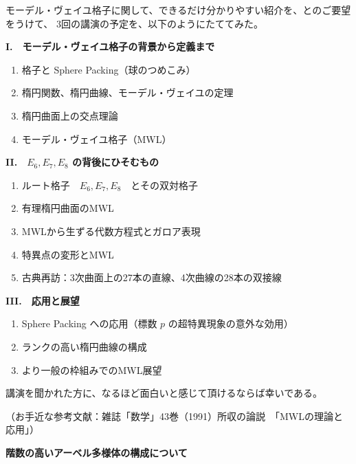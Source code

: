 \documentclass[uplatex,dvipdfmx]{jlreq}
\begin{document}
\bigskip

モーデル・ヴェイユ格子に関して、できるだけ分かりやすい紹介を、とのご要望をうけて、
3回の講演の予定を、以下のようにたててみた。

\bigskip\bigskip

\noindent\textbf{I\@.　モーデル・ヴェイユ格子の背景から定義まで}
\begin{enumerate}
  \setlength{\itemsep}{0pt}
  \item 格子と Sphere Packing（球のつめこみ）
  \item 楕円関数、楕円曲線、モーデル・ヴェイユの定理
  \item 楕円曲面上の交点理論
  \item モーデル・ヴェイユ格子（MWL）
\end{enumerate}

\bigskip

\noindent\textbf{II\@.　$E_6, E_7, E_8$ の背後にひそむもの}
\begin{enumerate}
  \setlength{\itemsep}{0pt}
  \item ルート格子　$E_6, E_7, E_8$　とその双対格子
  \item 有理楕円曲面のMWL
  \item MWLから生ずる代数方程式とガロア表現
  \item 特異点の変形とMWL
  \item 古典再訪：3次曲面上の27本の直線、4次曲線の28本の双接線
\end{enumerate}

\bigskip

\noindent\textbf{III\@.　応用と展望}
\begin{enumerate}
  \setlength{\itemsep}{0pt}
  \item Sphere Packing への応用（標数 $p$ の超特異現象の意外な効用）
  \item ランクの高い楕円曲線の構成
  \item より一般の枠組みでのMWL展望
\end{enumerate}

\bigskip\bigskip

講演を聞かれた方に、なるほど面白いと感じて頂けるならば幸いである。

\bigskip

\noindent
（お手近な参考文献：雑誌「数学」43巻（1991）所収の論説　「MWLの理論と応用」）

\newpage

\begin{center}
{\large\bfseries 階数の高いアーベル多様体の構成について}

\hspace*{\fill}{\large\bfseries 寺杣 友秀}
\end{center}
\end{document}
